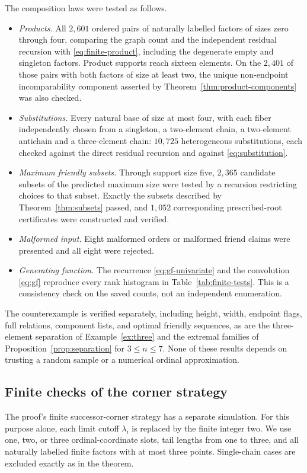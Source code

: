 \documentclass[11pt,letterpaper]{article}
\theoremstyle{definition}
\theoremstyle{remark}
\begin{document}
The composition laws were tested as follows.
\begin{itemize}
\item \emph{Products.} All $2{,}601$ ordered pairs of naturally labelled
factors of sizes zero through four, comparing the graph count and the
independent residual recursion with \eqref{eq:finite-product}, including the
degenerate empty and singleton factors. Product supports reach sixteen
elements. On the $2{,}401$ of those pairs with both factors of size at least
two, the unique non-endpoint incomparability component asserted by
Theorem~\ref{thm:product-components} was also checked.
\item \emph{Substitutions.} Every natural base of size at most four, with
each fiber independently chosen from a singleton, a two-element chain, a
two-element antichain and a three-element chain: $10{,}725$ heterogeneous
substitutions, each checked against the direct residual recursion and
against \eqref{eq:substitution}.
\item \emph{Maximum friendly subsets.} Through support size five,
$2{,}365$ candidate subsets of the predicted maximum size were tested by a
recursion restricting choices to that subset. Exactly the subsets described
by Theorem~\ref{thm:subsets} passed, and $1{,}052$ corresponding
prescribed-root certificates were constructed and verified.
\item \emph{Malformed input.} Eight malformed orders or malformed friend
claims were presented and all eight were rejected.
\item \emph{Generating function.} The recurrence
\eqref{eq:gf-univariate} and the convolution \eqref{eq:gf} reproduce every
rank histogram in Table~\ref{tab:finite-tests}. This is a consistency check
on the saved counts, not an independent enumeration.
\end{itemize}

The counterexample is verified separately, including height, width,
endpoint flags, full relations, component lists, and optimal friendly
sequences, as are the three-element separation of Example~\ref{ex:three} and
the extremal families of Proposition~\ref{prop:separation} for
$3\le n\le7$. None of these results depends on trusting a random sample or
a numerical ordinal approximation.

\subsection{Finite checks of the corner strategy}
The proof's finite successor-corner strategy has a separate simulation.
For this purpose alone, each limit cutoff $\lambda_i$ is replaced by the
finite integer two. We use one, two, or three ordinal-coordinate slots,
tail lengths from one to three, and all naturally labelled finite factors
with at most three points. Single-chain cases are excluded exactly as in
the theorem.
\end{document}
